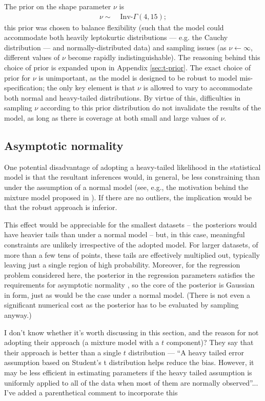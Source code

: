 \documentclass[fleqn,usenatbib]{rasti}
\begin{document}
The prior on the shape parameter $\nu$ is
\begin{align}
    \nu \sim&\; \text{Inv-}\Gamma(4, 15);
\end{align}
this prior was chosen to balance flexibility (such that the model could
accommodate both heavily leptokurtic distributions --- e.g. the Cauchy
distribution --- and normally-distributed data) and sampling issues (as $\nu
\leftarrow \infty$, different values of $\nu$ become rapidly indistinguishable).
The reasoning behind this choice of prior is expanded upon in Appendix
\ref{sec:t-prior}. The exact choice of prior for $\nu$ is unimportant, as the
model is designed to be robust to model mis-specification; the only key element
is that $\nu$ is allowed to vary to accommodate both normal and heavy-tailed
distributions. By virtue of this, difficulties in sampling $\nu$ according to
this prior distribution do not invalidate the results of the model, as long as
there is coverage at both small and large values of $\nu$.

\subsection{Asymptotic normality}
\label{sec:formalism.asymptotic}

One potential disadvantage of adopting a heavy-tailed likelihood in the
statistical model is that the resultant inferences would, in general, be less
constraining than under the assumption of a normal model (see, e.g., the
motivation behind the mixture model proposed in \citealt{Tak:2019}).  If there
are no outliers, the implication would be that the robust approach is inferior.

This effect would be appreciable for the smallest datasets -- the posteriors
would have heavier tails than under a normal model -- but, in this case,
meaningful constraints are unlikely irrespective of the adopted model. For
larger datasets, of more than a few tens of points, these tails are effectively
multiplied out, typically leaving just a single region of high probability.
Moreover, for the regression problem considered here, the posterior in the
regression parameters satisfies the requirements for asymptotic normality
\citep[e.g.][]{Ghosh_etal:2006}, so the core of the posterior is Gaussian in
form, just as would be the case under a normal model.  (There is not even a
significant numerical cost as the posterior has to be evaluated by sampling
anyway.)

{\color{blue} I don't know whether it's worth discussing \citet{Tak:2019} in
this section, and the reason for not adopting their approach (a mixture model
with a $t$ component)? They say that their approach is better than a single $t$
distribution --- ``A heavy tailed error assumption based on Student’s t
distribution helps reduce the bias. However, it may be less efficient in
estimating parameters if the heavy tailed assumption is uniformly applied to all
of the data when most of them are normally observed''... I've added a
parenthetical comment to incorporate this}
\end{document}
